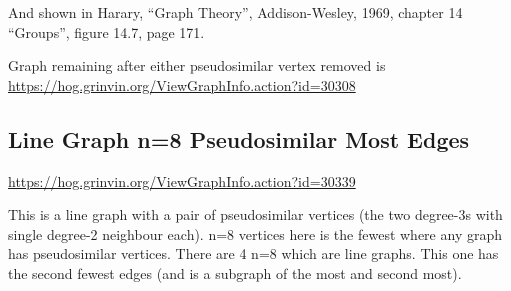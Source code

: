 \documentclass{article}
\begin{document}
And shown in Harary, ``Graph Theory'', Addison-Wesley, 1969, chapter 14
``Groups'', figure 14.7, page 171.


\smallskip

\begin{center}
\end{center}

Graph remaining after either pseudosimilar vertex removed is \newline
\url{https://hog.grinvin.org/ViewGraphInfo.action?id=30308}

\subsection{Line Graph n=8 Pseudosimilar Most Edges}

\url{https://hog.grinvin.org/ViewGraphInfo.action?id=30339}

\smallskip

This is a line graph with a pair of pseudosimilar vertices (the two
degree-3s with single degree-2 neighbour each).  n=8 vertices here is
the fewest where any graph has pseudosimilar vertices.  There are 4
n=8 which are line graphs.  This one has the second fewest edges (and
is a subgraph of the most and second most).

\smallskip
\end{document}

